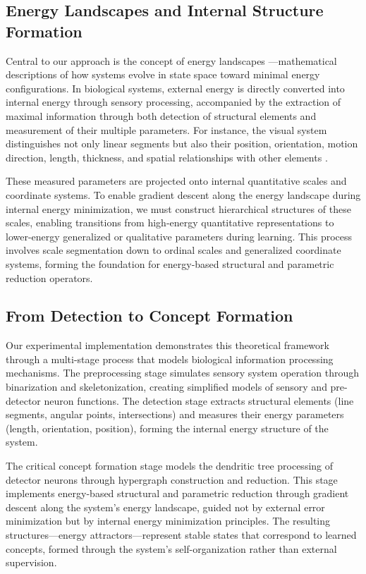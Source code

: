 \documentclass[12pt, a4paper]{article}
\begin{document}
\subsection*{Energy Landscapes and Internal Structure Formation}

Central to our approach is the concept of energy landscapes \cite{hopfield1982}—mathematical descriptions of how systems evolve in state space toward minimal energy configurations. In biological systems, external energy is directly converted into internal energy through sensory processing, accompanied by the extraction of maximal information through both detection of structural elements and measurement of their multiple parameters. For instance, the visual system distinguishes not only linear segments but also their position, orientation, motion direction, length, thickness, and spatial relationships with other elements \cite{hubel1968}.

These measured parameters are projected onto internal quantitative scales and coordinate systems. To enable gradient descent along the energy landscape during internal energy minimization, we must construct hierarchical structures of these scales, enabling transitions from high-energy quantitative representations to lower-energy generalized or qualitative parameters during learning. This process involves scale segmentation down to ordinal scales and generalized coordinate systems, forming the foundation for energy-based structural and parametric reduction operators.

\subsection*{From Detection to Concept Formation}

Our experimental implementation demonstrates this theoretical framework through a multi-stage process that models biological information processing mechanisms. The preprocessing stage simulates sensory system operation through binarization and skeletonization, creating simplified models of sensory and pre-detector neuron functions. The detection stage extracts structural elements (line segments, angular points, intersections) and measures their energy parameters (length, orientation, position), forming the internal energy structure of the system.

The critical concept formation stage models the dendritic tree processing of detector neurons through hypergraph construction and reduction. This stage implements energy-based structural and parametric reduction through gradient descent along the system's energy landscape, guided not by external error minimization but by internal energy minimization principles. The resulting structures—energy attractors—represent stable states that correspond to learned concepts, formed through the system's self-organization rather than external supervision.
\end{document}
